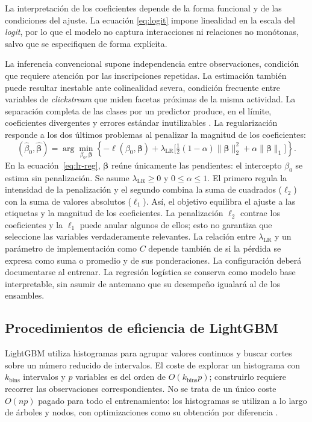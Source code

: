 La interpretación de los coeficientes depende de la forma funcional y de las condiciones del ajuste. La ecuación \eqref{eq:logit} impone linealidad en la escala del \textit{logit}, por lo que el modelo no captura interacciones ni relaciones no monótonas, salvo que se especifiquen de forma explícita.

La inferencia convencional supone independencia entre observaciones, condición que requiere atención por las inscripciones repetidas. La estimación también puede resultar inestable ante colinealidad severa, condición frecuente entre variables de \textit{clickstream} que miden facetas próximas de la misma actividad. La separación completa de las clases por un predictor produce, en el límite, coeficientes divergentes y errores estándar inutilizables \cite{hosmer2013}. La regularización responde a los dos últimos problemas al penalizar la magnitud de los coeficientes:
\begin{equation}\label{eq:lr-reg}
(\hat\beta_0,\hat{\boldsymbol{\beta}})
=\arg\min_{\beta_0,\boldsymbol{\beta}}
\left\{-\ell(\beta_0,\boldsymbol{\beta})
+\lambda_{\mathrm{LR}}\Big[\tfrac{1}{2}(1-\alpha)\lVert\boldsymbol{\beta}\rVert_{2}^{2}
+\alpha\lVert\boldsymbol{\beta}\rVert_{1}\Big]\right\}.
\end{equation}
En la ecuación~\eqref{eq:lr-reg}, $\boldsymbol{\beta}$ reúne únicamente las pendientes: el intercepto $\beta_0$ se estima sin penalización. Se asume $\lambda_{\mathrm{LR}}\geq0$ y $0\leq\alpha\leq1$. El primero regula la intensidad de la penalización y el segundo combina la suma de cuadrados ($\ell_2$) con la suma de valores absolutos ($\ell_1$). Así, el objetivo equilibra el ajuste a las etiquetas y la magnitud de los coeficientes. La penalización $\ell_2$ contrae los coeficientes y la $\ell_1$ puede anular algunos de ellos; esto no garantiza que seleccione las variables verdaderamente relevantes. La relación entre $\lambda_{\mathrm{LR}}$ y un parámetro de implementación como $C$ depende también de si la pérdida se expresa como suma o promedio y de sus ponderaciones. La configuración deberá documentarse al entrenar. La regresión logística se conserva como modelo base interpretable, sin asumir de antemano que su desempeño igualará al de los ensambles.


\subsection{Procedimientos de eficiencia de LightGBM}\label{clara:lightgbm}
LightGBM utiliza histogramas para agrupar valores continuos y buscar cortes sobre un número reducido de intervalos. El coste de explorar un histograma con $k_{\mathrm{bins}}$ intervalos y $p$ variables es del orden de $O(k_{\mathrm{bins}}p)$; construirlo requiere recorrer las observaciones correspondientes. No se trata de un único coste $O(np)$ pagado para todo el entrenamiento: los histogramas se utilizan a lo largo de árboles y nodos, con optimizaciones como su obtención por diferencia \cite{revlightfeatures}.

